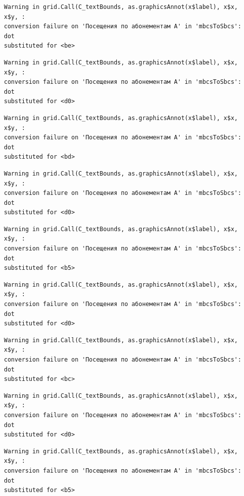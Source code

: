 \documentclass[
  letterpaper,
  DIV=11,
  numbers=noendperiod]{scrartcl}
\begin{document}
\begin{verbatim}
Warning in grid.Call(C_textBounds, as.graphicsAnnot(x$label), x$x, x$y, :
conversion failure on 'Посещения по абонементам А' in 'mbcsToSbcs': dot
substituted for <be>
\end{verbatim}

\begin{verbatim}
Warning in grid.Call(C_textBounds, as.graphicsAnnot(x$label), x$x, x$y, :
conversion failure on 'Посещения по абонементам А' in 'mbcsToSbcs': dot
substituted for <d0>
\end{verbatim}

\begin{verbatim}
Warning in grid.Call(C_textBounds, as.graphicsAnnot(x$label), x$x, x$y, :
conversion failure on 'Посещения по абонементам А' in 'mbcsToSbcs': dot
substituted for <bd>
\end{verbatim}

\begin{verbatim}
Warning in grid.Call(C_textBounds, as.graphicsAnnot(x$label), x$x, x$y, :
conversion failure on 'Посещения по абонементам А' in 'mbcsToSbcs': dot
substituted for <d0>
\end{verbatim}

\begin{verbatim}
Warning in grid.Call(C_textBounds, as.graphicsAnnot(x$label), x$x, x$y, :
conversion failure on 'Посещения по абонементам А' in 'mbcsToSbcs': dot
substituted for <b5>
\end{verbatim}

\begin{verbatim}
Warning in grid.Call(C_textBounds, as.graphicsAnnot(x$label), x$x, x$y, :
conversion failure on 'Посещения по абонементам А' in 'mbcsToSbcs': dot
substituted for <d0>
\end{verbatim}

\begin{verbatim}
Warning in grid.Call(C_textBounds, as.graphicsAnnot(x$label), x$x, x$y, :
conversion failure on 'Посещения по абонементам А' in 'mbcsToSbcs': dot
substituted for <bc>
\end{verbatim}

\begin{verbatim}
Warning in grid.Call(C_textBounds, as.graphicsAnnot(x$label), x$x, x$y, :
conversion failure on 'Посещения по абонементам А' in 'mbcsToSbcs': dot
substituted for <d0>
\end{verbatim}

\begin{verbatim}
Warning in grid.Call(C_textBounds, as.graphicsAnnot(x$label), x$x, x$y, :
conversion failure on 'Посещения по абонементам А' in 'mbcsToSbcs': dot
substituted for <b5>
\end{verbatim}
\end{document}
